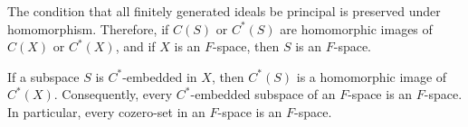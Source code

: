 The condition that all finitely generated ideals be principal is preserved under homomorphism. Therefore, if $C(S)$ or $C^*(S)$ are homomorphic images of $C(X)$ or $C^*(X)$, and if $X$ is an $F$-space, then $S$ is an $F$-space.

If a subspace $S$ is $C^*$-embedded in $X$, then $C^*(S)$ is a homomorphic image of $C^*(X)$. Consequently, every $C^*$-embedded subspace of an $F$-space is an $F$-space. In particular, every cozero-set in an $F$-space is an $F$-space.
